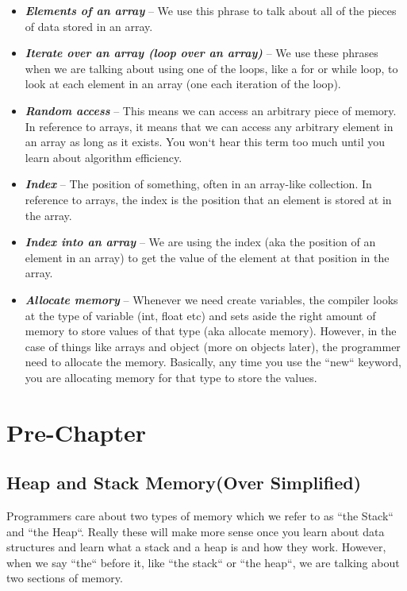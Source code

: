 \documentclass[11]{article}
\begin{document}
\begin{itemize}
  \item \textbf{\textit{Elements of an array}} -- We use this phrase to talk about all of the pieces of data stored in an array.
  
  \item \textbf{\textit{Iterate over an array (loop over an array)}} -- We use these phrases when we are talking about using one of the loops, like a for or while loop, to look at each element in an array (one each iteration of the loop).
  
  \item \textbf{\textit{Random access}} -- This means we can access an arbitrary piece of memory. In reference to arrays, it means that we can access any arbitrary element in an array as long as it exists. You won`t hear this term too much until you learn about algorithm efficiency.
  
  \item \textbf{\textit{Index}} -- The position of something, often in an array-like collection. In reference to arrays, the index is the position that an element is stored at in the array.
  
  \item \textbf{\textit{Index into an array}} -- We are using the index (aka the position of an element in an array) to get the value of the element at that position in the array.
  
  \item \textbf{\textit{Allocate memory}} -- Whenever we need create variables, the compiler looks at the type of variable  (int, float etc) and sets aside the right amount of memory to store values of that type (aka allocate memory). However, in the case of things like arrays and object (more on objects later), the programmer need to allocate the memory. Basically, any time you use the ``new`` keyword, you are allocating memory for that type to store the values.
  
\end{itemize}
\section{Pre-Chapter}
\subsection{Heap and Stack Memory(Over Simplified)}
\label{sec:heap}
Programmers care about two types of memory which we refer to as ``the Stack`` and ``the Heap``. Really these will make more sense once you learn about data structures and learn what a stack and a heap is and how they work. However, when we say ``the`` before it, like ``the stack`` or ``the heap``, we are talking about two sections of memory. \\
\end{document}
